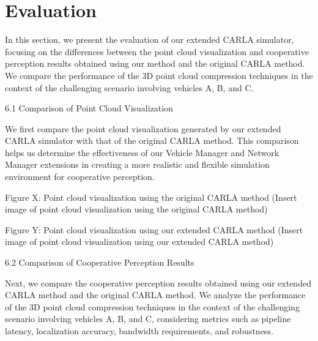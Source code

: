 \documentclass[conference]{IEEEtran}
\begin{document}



\section{Evaluation}
In this section, we present the evaluation of our extended CARLA simulator, focusing on the differences between the point cloud visualization and cooperative perception results obtained using our method and the original CARLA method. We compare the performance of the 3D point cloud compression techniques in the context of the challenging scenario involving vehicles A, B, and C.

6.1 Comparison of Point Cloud Visualization

We first compare the point cloud visualization generated by our extended CARLA simulator with that of the original CARLA method. This comparison helps us determine the effectiveness of our Vehicle Manager and Network Manager extensions in creating a more realistic and flexible simulation environment for cooperative perception.

Figure X: Point cloud visualization using the original CARLA method
(Insert image of point cloud visualization using the original CARLA method)

Figure Y: Point cloud visualization using our extended CARLA method
(Insert image of point cloud visualization using our extended CARLA method)

6.2 Comparison of Cooperative Perception Results

Next, we compare the cooperative perception results obtained using our extended CARLA method and the original CARLA method. We analyze the performance of the 3D point cloud compression techniques in the context of the challenging scenario involving vehicles A, B, and C, considering metrics such as pipeline latency, localization accuracy, bandwidth requirements, and robustness.
\end{document}
